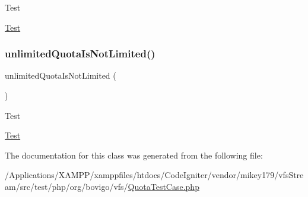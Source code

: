 \begin{DoxyRefDesc}{Test}
\item[\mbox{\hyperlink{test__test000009}{Test}}]\end{DoxyRefDesc}
\mbox{\label{classorg_1_1bovigo_1_1vfs_1_1_quota_test_case_a34ab6d3ce9666a582297524b9a5062bb}} 
\subsubsection{\texorpdfstring{unlimited\+Quota\+Is\+Not\+Limited()}{unlimitedQuotaIsNotLimited()}}
{\footnotesize\ttfamily unlimited\+Quota\+Is\+Not\+Limited (\begin{DoxyParamCaption}{ }\end{DoxyParamCaption})}

\begin{DoxyRefDesc}{Test}
\item[\mbox{\hyperlink{test__test000007}{Test}}]\end{DoxyRefDesc}


The documentation for this class was generated from the following file\+:\begin{DoxyCompactItemize}
\item 
/\+Applications/\+X\+A\+M\+P\+P/xamppfiles/htdocs/\+Code\+Igniter/vendor/mikey179/vfs\+Stream/src/test/php/org/bovigo/vfs/\mbox{\hyperlink{_quota_test_case_8php}{Quota\+Test\+Case.\+php}}\end{DoxyCompactItemize}
